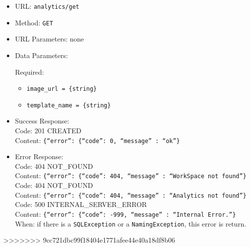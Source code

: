 \begin{itemize}
    \item URL: \texttt{analytics/get}
    \item Method: \texttt{GET}
    \item URL Parameters: none
    \item Data Parameters:
    
    Required:
    \begin{itemize}
        \item \texttt{image\_url = \{string\}}
        \item \texttt{template\_name = \{string\}}
    \end{itemize}
    
    
    \item Success Response:\\
    Code: 201 CREATED\\
    Content: \texttt{\{``error'': \{``code'': 0, ``message'' : ``ok''\}}\\
    
    \item Error Response:\\

    Code: 404 NOT\_FOUND\\
    Content: \texttt{\{``error'': \{``code'': 404, ``message'' : ``WorkSpace not found''\}}\\

    Code: 404 NOT\_FOUND\\
    Content: \texttt{\{``error'': \{``code'': 404, ``message'' : ``Analytics not found''\}}\\

    Code: 500 INTERNAL\_SERVER\_ERROR\\
    Content: \texttt{\{``error'': \{``code'': -999, ``message'' : ``Internal Error.''\}}\\
    When: if there is a \texttt{SQLException} or a \texttt{NamingException}, this error is return.\\
    
\end{itemize}
>>>>>>> 9cc721dbc99f18404e1771afee44e40a18df8b06

